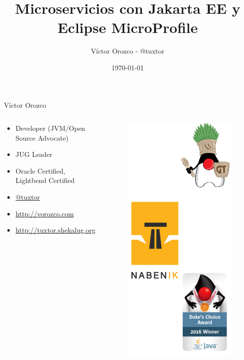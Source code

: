 \documentclass{beamer}
\title{Microservicios con Jakarta EE y Eclipse MicroProfile}
\author{Víctor Orozco - @tuxtor}
\institute{GuateJUG}
\date{\today}
\begin{document}
\frame{\titlepage}

\begin{frame}{Víctor Orozco}
\begin{columns}[T] %
	\begin{column}[T]{5cm} %
		\begin{itemize}
			\item Developer (JVM/Open Source Advocate)
			\item JUG Leader
			\item Oracle Certified, Lightbend Certified
			\item \href{https://twitter.com/tuxtor}{@tuxtor}
			\item \href{http://vorozco.com}{http://vorozco.com}
			\item \href{http://tuxtor.shekalug.org}{http://tuxtor.shekalug.org} 
		\end{itemize}
	\end{column}
	\begin{column}[T]{5cm} %
		\begin{figure}
			\centering
			\includegraphics[width=0.6\linewidth]{Images/logos}
		\end{figure}
		
	\end{column}
\end{columns}
\end{frame}
\end{document}

